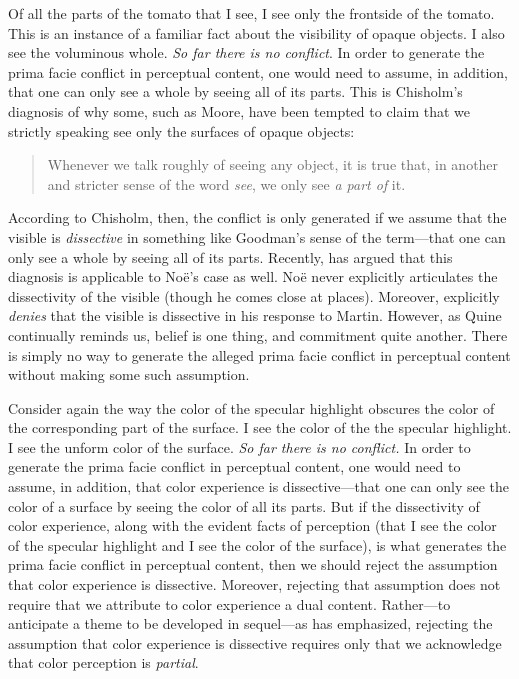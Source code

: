 \documentclass[12pt]{article}
\begin{document}
Of all the parts of the tomato that I see, I see only the frontside of the tomato. This is an instance of a familiar fact about the visibility of opaque objects. I also see the voluminous whole. \emph{So far there is no conflict}. In order to generate the prima facie conflict in perceptual content, one would need to assume, in addition, that one can only see a whole by seeing all of its parts. This is Chisholm's \citeyearpar[154--156]{Chisholm:1957dq} diagnosis of why some, such as Moore, have been tempted to claim that we strictly speaking see only the surfaces of opaque objects:
\begin{quote}
	Whenever we talk roughly of seeing any object, it is true that, in another and stricter sense of the word \emph{see}, we only see \emph{a part of} it. \citep[34]{Moore:1953nx}
\end{quote}
According to Chisholm, then, the conflict is only generated if we assume that the visible is \emph{dissective} in something like Goodman's \citeyearpar[48-49]{Goodman:1951ww} sense of the term---that one can only see a whole by seeing all of its parts. Recently, \citet{Martin:2008kl} has argued that this diagnosis is applicable to Noë's case as well. Noë never explicitly articulates the dissectivity of the visible (though he comes close at places). Moreover, \citet[698-699]{Noe:2008oq} explicitly \emph{denies} that the visible is dissective in his response to Martin. However, as Quine continually reminds us, belief is one thing, and commitment quite another. There is simply no way to generate the alleged prima facie conflict in perceptual content without making some such assumption.


Consider again the way the color of the specular highlight obscures the color of the corresponding part of the surface. I see the color of the the specular highlight. I see the unform color of the surface. \emph{So far there is no conflict.} In order to generate the prima facie conflict in perceptual content, one would need to assume, in addition, that color experience is dissective---that one can only see the color of a surface by seeing the color of all its parts. But if the dissectivity of color experience, along with the evident facts of perception (that I see the color of the specular highlight and I see the color of the surface), is what generates the prima facie conflict in perceptual content, then we should reject the assumption that color experience is dissective. Moreover, rejecting that assumption does not require that we attribute to color experience a dual content. Rather---to anticipate a theme to be developed in sequel---as \citet{Hilbert:1987jq} has emphasized, rejecting the assumption that color experience is dissective requires only that we acknowledge that color perception is \emph{partial}.
\end{document}
